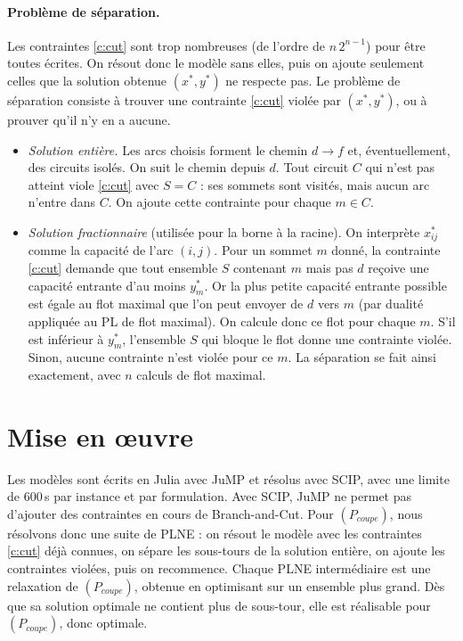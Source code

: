 \documentclass[11pt]{article}
\begin{document}
\paragraph{Problème de séparation.} Les contraintes \eqref{c:cut} sont trop nombreuses
(de l'ordre de $n\,2^{n-1}$) pour être toutes écrites. On résout donc le modèle sans elles,
puis on ajoute seulement celles que la solution obtenue $(x^*,y^*)$ ne respecte pas.
Le problème de séparation consiste à trouver une contrainte \eqref{c:cut} violée par
$(x^*,y^*)$, ou à prouver qu'il n'y en a aucune.
\begin{itemize}
\item \emph{Solution entière.} Les arcs choisis forment le chemin $d\to f$ et,
éventuellement, des circuits isolés. On suit le chemin depuis $d$. Tout circuit $C$ qui
n'est pas atteint viole \eqref{c:cut} avec $S=C$ : ses sommets sont visités, mais aucun
arc n'entre dans $C$. On ajoute cette contrainte pour chaque $m\in C$.
\item \emph{Solution fractionnaire} (utilisée pour la borne à la racine). On interprète
$x^*_{ij}$ comme la capacité de l'arc $(i,j)$. Pour un sommet $m$ donné, la contrainte
\eqref{c:cut} demande que tout ensemble $S$ contenant $m$ mais pas $d$ reçoive une
capacité entrante d'au moins $y^*_m$. Or la plus petite capacité entrante possible est
égale au flot maximal que l'on peut envoyer de $d$ vers $m$ (par dualité appliquée au PL
de flot maximal). On calcule donc ce flot pour chaque $m$. S'il est inférieur à $y^*_m$,
l'ensemble $S$ qui bloque le flot donne une contrainte violée. Sinon, aucune contrainte
n'est violée pour ce $m$. La séparation se fait ainsi exactement, avec $n$ calculs de
flot maximal.
\end{itemize}

\section{Mise en œuvre}

Les modèles sont écrits en Julia avec JuMP et résolus avec SCIP, avec une limite de
600\,s par instance et par formulation. Avec SCIP, JuMP ne permet pas d'ajouter
des contraintes en cours de Branch-and-Cut. Pour $(P_{coupe})$, nous résolvons donc une suite de PLNE : on résout le modèle avec les
contraintes \eqref{c:cut} déjà connues, on sépare les sous-tours de la solution entière,
on ajoute les contraintes violées, puis on recommence. Chaque PLNE intermédiaire est une
relaxation de $(P_{coupe})$, obtenue en optimisant sur un ensemble plus grand.
Dès que sa solution optimale ne contient plus de sous-tour, elle est réalisable pour
$(P_{coupe})$, donc optimale.
\end{document}
